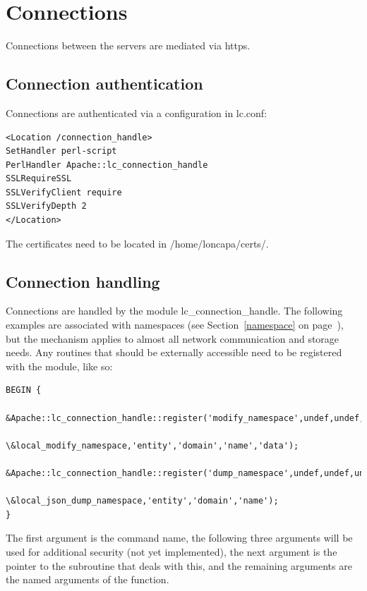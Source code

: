 \section{Connections}
Connections between the servers are mediated via https.
\subsection{Connection authentication}
Connections are authenticated via a configuration in lc.conf:
\begin{verbatim}
<Location /connection_handle>
SetHandler perl-script
PerlHandler Apache::lc_connection_handle
SSLRequireSSL
SSLVerifyClient require
SSLVerifyDepth 2
</Location>
\end{verbatim}
The certificates need to be located in /home/loncapa/certs/.

\subsection{Connection handling}
Connections are handled by the module lc\_connection\_handle. The following examples are associated with namespaces (see Section~\ref{namespace} on page~\pageref{namespace}), but the mechanism applies to almost all network communication and storage needs. Any routines that should be externally accessible need to be registered with the module, like so:
\begin{verbatim}
BEGIN {
    &Apache::lc_connection_handle::register('modify_namespace',undef,undef,undef,
                                            \&local_modify_namespace,'entity','domain','name','data');
    &Apache::lc_connection_handle::register('dump_namespace',undef,undef,undef,
                                            \&local_json_dump_namespace,'entity','domain','name');
}
\end{verbatim}
The first argument is the command name, the following three arguments will be used for additional security (not yet implemented), the next argument is the pointer to the subroutine that deals with this, and the remaining arguments are the named arguments of the function.
